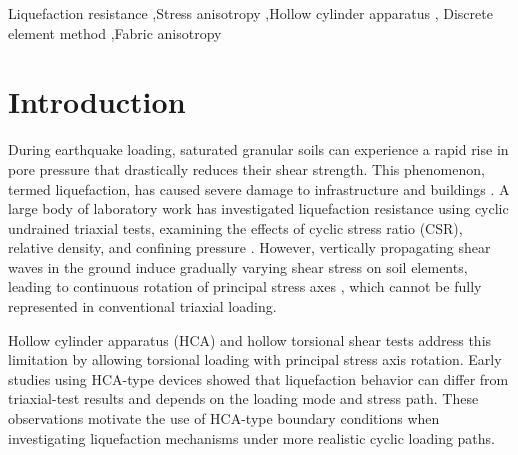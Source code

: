 \documentclass[a4paper,fleqn]{cas-sc}
\begin{document}
\begin{keywords}
Liquefaction resistance \sep Stress anisotropy \sep Hollow cylinder apparatus \sep
Discrete element method \sep Fabric anisotropy
\end{keywords}

\maketitle

\section{Introduction}
\label{sec:introduction}

During earthquake loading, saturated granular soils can experience a rapid rise in pore pressure that drastically reduces their shear strength. This phenomenon, termed liquefaction, has caused severe damage to infrastructure and buildings \citep{IshiharaKoga1981,SeedIdriss1967}. A large body of laboratory work has investigated liquefaction resistance using cyclic undrained triaxial tests, examining the effects of cyclic stress ratio (CSR), relative density, and confining pressure \citep{Hyodo1991,SeedLee1966,Silver1976,Toki1986}. However, vertically propagating shear waves in the ground induce gradually varying shear stress on soil elements, leading to continuous rotation of principal stress axes \citep{Arthur1980,IshiharaTowhata1983}, which cannot be fully represented in conventional triaxial loading.

Hollow cylinder apparatus (HCA) and hollow torsional shear tests address this limitation by allowing torsional loading with principal stress axis rotation. Early studies using HCA-type devices \citep[e.g.,][]{IshiharaYasuda1975,Tatsuoka1986,YamashitaToki1993} showed that liquefaction behavior can differ from triaxial-test results and depends on the loading mode and stress path. These observations motivate the use of HCA-type boundary conditions when investigating liquefaction mechanisms under more realistic cyclic loading paths.
\end{document}
